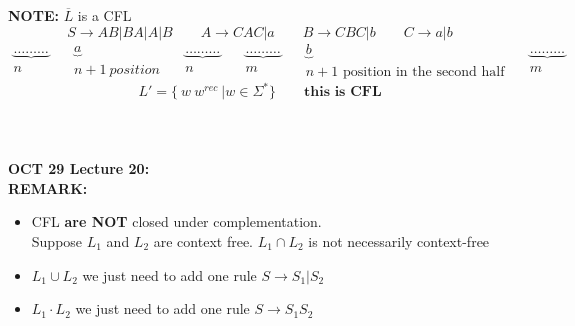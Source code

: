 \documentclass[11pt]{article}
\begin{document}
\textbf{NOTE:}
$\overline{L}$ is a CFL
$$S \to AB | BA | A | B \quad \quad A \to CAC | a \quad \quad B \to CBC|b \quad \quad C \to a | b$$
$$ \begin{matrix} \underbrace{ \ldots \ldots\ldots  } \\ n \end{matrix} \quad 
\begin{matrix} \underbrace{ a} \\ n + 1 \ position \end{matrix}
 \quad \begin{matrix} \underbrace{ \ldots \ldots\ldots } \\ n \end{matrix} \quad
\begin{matrix} \underbrace{ \ldots \ldots\ldots  } \\ m \end{matrix} \quad 
\begin{matrix} \underbrace{ b } \\ n + 1 \text{ position in the second half}\end{matrix}
 \quad \begin{matrix} \underbrace{ \ldots \ldots\ldots } \\ m \end{matrix} \quad $$
\newline
$$ L' = \{\ w\ w^{rec}\  | w \in \Sigma^* \}\quad\quad \textbf{this is CFL}$$
\\
\\
\\
\textbf{OCT 29 Lecture 20:}\\
\textbf{REMARK:}\\
\begin{itemize}
	\item CFL \textbf{are NOT} closed under complementation. \\
	Suppose $L_1$ and $L_2$ are context free. $L_1 \cap L_2$ is not necessarily context-free
	\item $L_1 \cup L_2$ we just need to add one rule $S \to S_1 | S_2$
	\item $L_1 \cdot L_2$ we just need to add one rule $S \to S_1  S_2$
\end{itemize}
\end{document}
